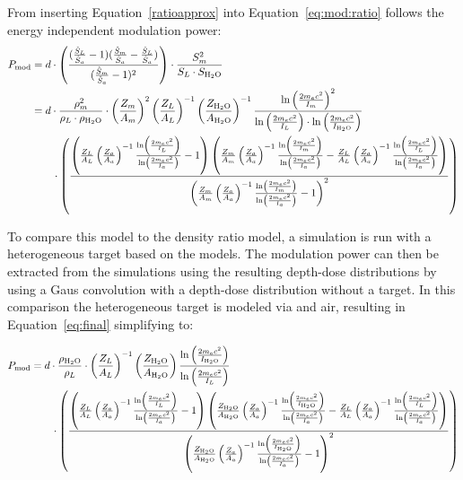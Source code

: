 \documentclass{article}
\begin{document}
From inserting Equation~\ref{ratioapprox} into Equation~\ref{eq:mod:ratio} follows the energy independent modulation power:
\begin{align}
    P_{\text{mod}}   &= d \cdot \left(\frac{(\frac{\hat{S}_L}{\hat{S}_a}-1)(\frac{\hat{S}_m}{\hat{S}_a}-\frac{\hat{S}_L}{\hat{S}_a})}{(\frac{\hat{S}_m}{\hat{S}_a}-1)^2} \right)\cdot \frac{S_m^2}{S_{L}\cdot S_{\ce{H2O}}} \\
    &= d \cdot \frac{\rho_m^2}{\rho_L \cdot \rho_{\ce{H2O}}} \cdot \left(\frac{Z_m}{A_m}\right)^2\left(\frac{Z_L}{A_L}\right)^{-1}\left(\frac{Z_{\ce{H2O}}}{A_{\ce{H2O}}}\right)^{-1}\frac{\ln\left(\frac{2m_ec^2}{I_m}\right)^2}{\ln\left(\frac{2m_ec^2}{I_L}\right)\cdot \ln\left(\frac{2m_ec^2}{I_{\ce{H2O}}}\right)} \\
    &\qquad \cdot \left(\frac{\left(\frac{Z_L}{A_L}\left(\frac{Z_a}{A_a}\right)^{-1}\frac{\ln\left(\frac{2m_ec^2}{I_L}\right)}{\ln\left(\frac{2m_ec^2}{I_a}\right)}-1\right)\left(\frac{Z_m}{A_m}\left(\frac{Z_a}{A_a}\right)^{-1}\frac{\ln\left(\frac{2m_ec^2}{I_m}\right)}{\ln\left(\frac{2m_ec^2}{I_a}\right)}-\frac{Z_L}{A_L}\left(\frac{Z_a}{A_a}\right)^{-1}\frac{\ln\left(\frac{2m_ec^2}{I_L}\right)}{\ln\left(\frac{2m_ec^2}{I_a}\right)}\right)}{\left(\frac{Z_m}{A_m}\left(\frac{Z_a}{A_a}\right)^{-1}\frac{\ln\left(\frac{2m_ec^2}{I_m}\right)}{\ln\left(\frac{2m_ec^2}{I_a}\right)}-1\right)^2} \right) \label{eq:final}
\end{align}

To compare this model to the density ratio model, a simulation is run with a heterogeneous target based on the models.
The modulation power can then be extracted from the simulations using the resulting depth-dose distributions by using a Gaus convolution with a depth-dose distribution without a target.
In this comparison the heterogeneous target is modeled via  and air, resulting in Equation~\ref{eq:final} simplifying to:

\begin{align}
    P_{\text{mod}} &= d \cdot \frac{\rho_{\ce{H2O}}}{\rho_L} \cdot \left(\frac{Z_L}{A_L}\right)^{-1}\left(\frac{Z_{\ce{H2O}}}{A_{\ce{H2O}}}\right)\frac{\ln\left(\frac{2m_ec^2}{I_{\ce{H2O}}}\right)}{\ln\left(\frac{2m_ec^2}{I_L}\right)} \\
    &\qquad \cdot \left(\frac{\left(\frac{Z_L}{A_L}\left(\frac{Z_a}{A_a}\right)^{-1}\frac{\ln\left(\frac{2m_ec^2}{I_L}\right)}{\ln\left(\frac{2m_ec^2}{I_a}\right)}-1\right)\left(\frac{Z_{\ce{H2O}}}{A_{\ce{H2O}}}\left(\frac{Z_a}{A_a}\right)^{-1}\frac{\ln\left(\frac{2m_ec^2}{I_{\ce{H2O}}}\right)}{\ln\left(\frac{2m_ec^2}{I_a}\right)}-\frac{Z_L}{A_L}\left(\frac{Z_a}{A_a}\right)^{-1}\frac{\ln\left(\frac{2m_ec^2}{I_L}\right)}{\ln\left(\frac{2m_ec^2}{I_a}\right)}\right)}{\left(\frac{Z_{\ce{H2O}}}{A_{\ce{H2O}}}\left(\frac{Z_a}{A_a}\right)^{-1}\frac{\ln\left(\frac{2m_ec^2}{I_{\ce{H2O}}}\right)}{\ln\left(\frac{2m_ec^2}{I_a}\right)}-1\right)^2} \right)
\end{align}
\end{document}
